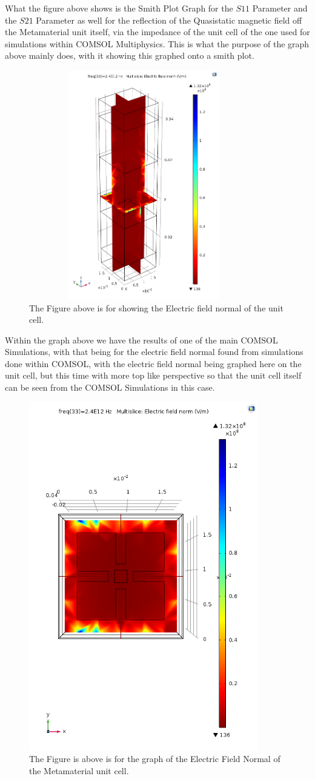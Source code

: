 \documentclass[]{article}
\begin{document}
\noindent
What the figure above shows is the Smith Plot Graph for the $S11$ Parameter and the $S21$ Parameter as well for the reflection of the Quasistatic magnetic field off the Metamaterial unit itself, via the impedance of the unit cell of the one used for simulations within COMSOL Multiphysics. This is what the purpose of the graph above mainly does, with it showing this graphed onto a smith plot.
\begin{figure}[H]
	\centering
	\includegraphics[width=10cm, height=10cm]{ElectricFieldNormalGraphImage2.png}
	\caption{The Figure above is for showing the Electric field normal of the unit cell.}
	\label{test11122}
\end{figure}
\noindent
Within the graph above we have the results of one of the main COMSOL Simulations, with that being for the electric field normal found from simulations done within COMSOL, with the electric field normal being graphed here on the unit cell, but this time with more top like perspective so that the unit cell itself can be seen from the COMSOL Simulations in this case.
\begin{figure}[H]
	\centering
	\includegraphics[width=10cm, height=10 cm]{ElectricFieldNormalGraphImage.png}
	\caption{The Figure is above is for the graph of the Electric Field Normal of the Metamaterial unit cell.}
	\label{test2121}
\end{figure}
\end{document}
